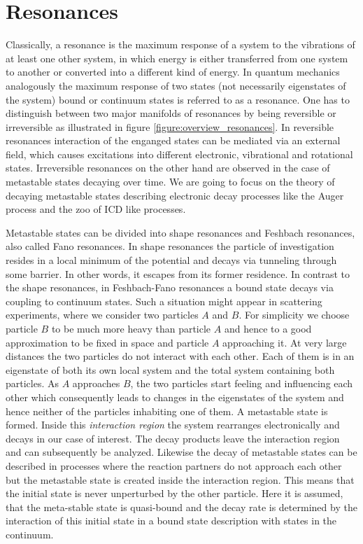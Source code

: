 \chapter{Resonances}

Classically, a resonance is the maximum response of a system to the vibrations
of at least one other
system, in which energy is either transferred from 
one system to another or converted into a different kind of energy.
In quantum mechanics analogously the maximum response 
of two states (not necessarily eigenstates of the system) 
bound or continuum states is referred to as a resonance.
One has to distinguish between two major manifolds of resonances
by being reversible or irreversible \cite{Cohen-Tannoudji_3_2}
as illustrated in figure
\ref{figure:overview_resonances}.
In reversible resonances
interaction of the enganged states can be mediated via an external field,
which causes excitations
into different electronic, vibrational and rotational states.
Irreversible resonances on the other hand are observed in the case of
metastable states decaying over time. We are going to focus on the theory of
decaying metastable states describing electronic decay processes like the
Auger process and the zoo of \ac{ICD} like processes. 

Metastable states can be divided into shape resonances and Feshbach resonances,
also called Fano resonances. In shape resonances the particle of investigation
resides in
a local minimum of the potential and decays via tunneling through some barrier.
\cite{Klaiman12}
In other words, it escapes from its former residence.
In contrast to the shape resonances, in Feshbach-Fano resonances
a bound state decays via coupling to continuum states. Such a situation might
appear in scattering experiments, where we consider two particles $A$ and $B$.
For simplicity we choose particle $B$ to be much more heavy than particle $A$ and
hence to a good approximation to be fixed in space and particle $A$
approaching it. At very large distances the two particles do not interact with
each other. Each of them is in an eigenstate of both its own local system
and the total system containing both particles. As $A$ approaches $B$, the two
particles start feeling and influencing each other which consequently leads
to changes in the eigenstates of the system and hence neither of the particles
inhabiting one of them. A metastable state is formed. Inside this
\emph{interaction region} the system
rearranges electronically and decays in our case of interest. The decay
products leave the interaction region and can subsequently be analyzed.
Likewise the decay of metastable states can be described in processes
where the reaction partners do not approach each other but the metastable
state is created inside the interaction region. This means that the initial
state is never unperturbed by the other particle. Here it is assumed, that
the meta-stable state is quasi-bound and the decay rate is determined by
the interaction of this initial state in a bound state description with
states in the continuum.

